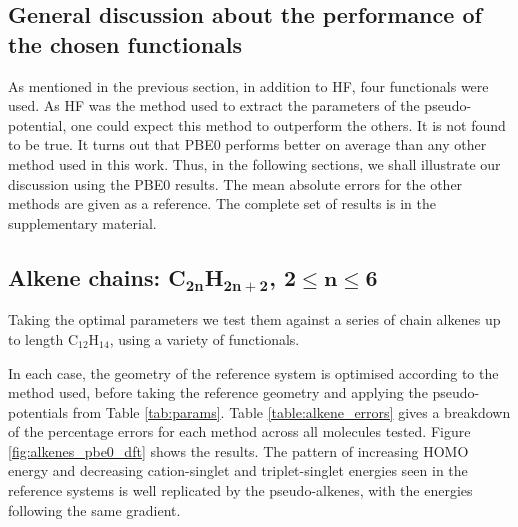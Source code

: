 \documentclass[aip]{revtex4-1}
\begin{document}
\subsection{General discussion about the performance of the chosen functionals}
As mentioned in the previous section, in addition to HF, four functionals were used.
As HF was the method used to extract the parameters of the pseudo-potential, one could expect
this method to outperform the others.
It is not found to be true.
It turns out that PBE0 performs better on average than any other method used in this work.
Thus, in the following sections, we shall illustrate our discussion using the PBE0 results.
The mean absolute errors for the other methods are given as a reference.
The complete set of results is in the supplementary material.

\subsection{Alkene chains: C\(\mathbf{_{2n}}\)H\(\mathbf{_{2n+2}}\), \(\mathbf{2 \leq n \leq 6}\)}

Taking the optimal parameters we test them against a series of chain alkenes up to
length C\(_{12}\)H\(_{14}\), using a variety of functionals.

In each case, the geometry of the reference system is optimised according to the method used,
before taking the reference geometry and applying the pseudo-potentials from Table \ref{tab:params}. Table \ref{table:alkene_errors} gives a breakdown of the percentage errors for each method
across all molecules tested.
Figure \ref{fig:alkenes_pbe0_dft} shows the results.
The pattern of increasing HOMO energy and decreasing cation-singlet and triplet-singlet
energies seen in the reference systems is well replicated by the pseudo-alkenes,
with the energies following the same gradient.
\end{document}
